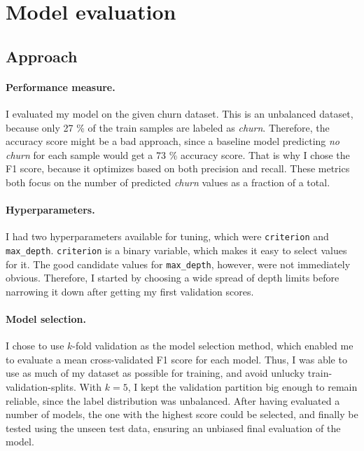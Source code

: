 \documentclass{article}
\begin{document}
\section{Model evaluation}

\subsection{Approach}

\paragraph{Performance measure.}
I evaluated my model on the given churn dataset.
This is an unbalanced dataset, because only 27 \% of the train samples are labeled as \textit{churn}.
Therefore, the accuracy score might be a bad approach, 
since a baseline model predicting \textit{no churn} for each sample would get a 73 \% accuracy score.
That is why I chose the F1 score, because it optimizes based on both precision and recall.
These metrics both focus on the number of predicted \textit{churn} values as a fraction of a total.

\paragraph{Hyperparameters.}
I had two hyperparameters available for tuning,
which were \texttt{criterion} and \texttt{max\_depth}.
\texttt{criterion} is a binary variable, which makes it easy to select values for it.
The good candidate values for \texttt{max\_depth}, however, were not immediately obvious.
Therefore, I started by choosing a wide spread of depth limits before narrowing
it down after getting my first validation scores.

\paragraph{Model selection.}
I chose to use $k$-fold validation as the model selection method,
which enabled me to evaluate a mean cross-validated F1 score for each model.
Thus, I was able to use as much of my dataset as possible for training, and avoid
unlucky train-validation-splits. With $k = 5$, I kept the validation partition
big enough to remain reliable, since the label distribution was unbalanced.
After having evaluated a number of models, the one with the highest score could
be selected, and finally be tested using the unseen test data, ensuring an unbiased final 
evaluation of the model.
\end{document}
